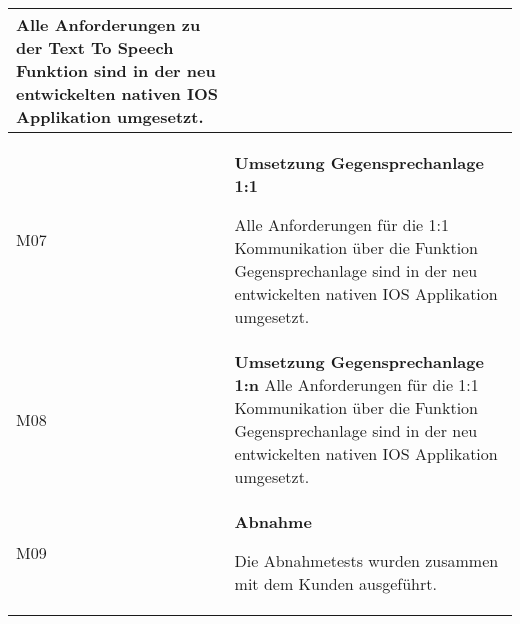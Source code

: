 \begin{table}[h]
\begin{tabular}{|l|p{15cm}|}
        Alle Anforderungen zu der Text To Speech Funktion sind in der neu entwickelten nativen IOS Applikation umgesetzt. \\
        \hline

        M07         & \textbf{Umsetzung Gegensprechanlage 1:1}

        Alle Anforderungen für die 1:1 Kommunikation über die Funktion Gegensprechanlage sind in der neu entwickelten nativen IOS Applikation umgesetzt. \\
        \hline

        M08         & \textbf{Umsetzung Gegensprechanlage 1:n}
        Alle Anforderungen für die 1:1 Kommunikation über die Funktion Gegensprechanlage sind in der neu entwickelten nativen IOS Applikation umgesetzt. \\
        \hline

        M09         & \textbf{Abnahme}

        Die Abnahmetests wurden zusammen mit dem Kunden ausgeführt. \\
        \hline



    \end{tabular}\label{tab:milestones}
\end{table}

\clearpage
